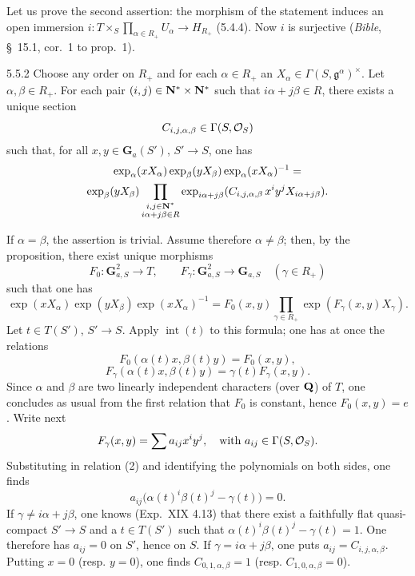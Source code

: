 Let us prove the second assertion: the morphism of the statement induces an open immersion $i:T\times_S\prod_{\alpha\in R_+}U_\alpha\to H_{R_+}$ (5.4.4). Now $i$ is surjective (\textit{Bible}, \S~15.1, cor.~1 to prop.~1).
\begin{corollary}{5.5.2}\label{XXII.5.5.2}
Choose any order on $R_+$ and for each $\alpha\in R_+$ an $X_\alpha\in\Gamma(S,\mathfrak g^\alpha)^\times$. Let $\alpha,\beta\in R_+$. For each pair $(i,j)\in\mathbf{N}^*\times\mathbf{N}^*$ such that $i\alpha+j\beta\in R$, there exists a unique section
\[
C_{i,j,\alpha,\beta}\in\Gamma(S,\mathcal{O}_S)
\]
such that, for all $x,y\in\mathbf G_a(S')$, $S'\to S$, one has
\[
\begin{gathered}
\exp_\alpha(xX_\alpha)\exp_\beta(yX_\beta)\exp_\alpha(xX_\alpha)^{-1}=\\
\exp_\beta(yX_\beta)\prod_{\substack{i,j\in\mathbf{N}^*\\i\alpha+j\beta\in R}}
\exp_{i\alpha+j\beta}(C_{i,j,\alpha,\beta}\,x^iy^jX_{i\alpha+j\beta}).
\end{gathered}
\]
\end{corollary}
If $\alpha=\beta$, the assertion is trivial. Assume therefore $\alpha\ne\beta$; then, by the proposition, there exist unique morphisms
\[
F_0:\mathbf G_{a,S}^2\to T,\qquad F_\gamma:\mathbf G_{a,S}^2\to\mathbf G_{a,S}\quad(\gamma\in R_+)
\]
such that one has
\[
\exp(xX_\alpha)\exp(yX_\beta)\exp(xX_\alpha)^{-1}=F_0(x,y)\prod_{\gamma\in R_+}\exp(F_\gamma(x,y)X_\gamma).
\]
Let $t\in T(S')$, $S'\to S$. Apply $\operatorname{int}(t)$ to this formula; one has at once the relations
\begin{equation}\tag{1}\label{XXII.eq.5.5.2.1}
F_0(\alpha(t)x,\beta(t)y)=F_0(x,y),
\end{equation}
\begin{equation}\tag{2}\label{XXII.eq.5.5.2.2}
F_\gamma(\alpha(t)x,\beta(t)y)=\gamma(t)F_\gamma(x,y).
\end{equation}
Since $\alpha$ and $\beta$ are two linearly independent characters (over $\mathbf{Q}$) of $T$, one concludes as usual from the first relation that $F_0$ is constant, hence $F_0(x,y)=e$. Write next
\[
F_\gamma(x,y)=\sum a_{ij}x^iy^j,\quad\text{with }a_{ij}\in\Gamma(S,\mathcal{O}_S).
\]
Substituting in relation (2) and identifying the polynomials on both sides, one finds
\[
a_{ij}\bigl(\alpha(t)^i\beta(t)^j-\gamma(t)\bigr)=0.
\]
If $\gamma\ne i\alpha+j\beta$, one knows (Exp.~XIX 4.13) that there exist a faithfully flat quasi-compact $S'\to S$ and a $t\in T(S')$ such that $\alpha(t)^i\beta(t)^j-\gamma(t)=1$. One therefore has $a_{ij}=0$ on $S'$, hence on $S$. If $\gamma=i\alpha+j\beta$, one puts $a_{ij}=C_{i,j,\alpha,\beta}$. Putting $x=0$ (resp. $y=0$), one finds $C_{0,1,\alpha,\beta}=1$ (resp. $C_{1,0,\alpha,\beta}=0$).
